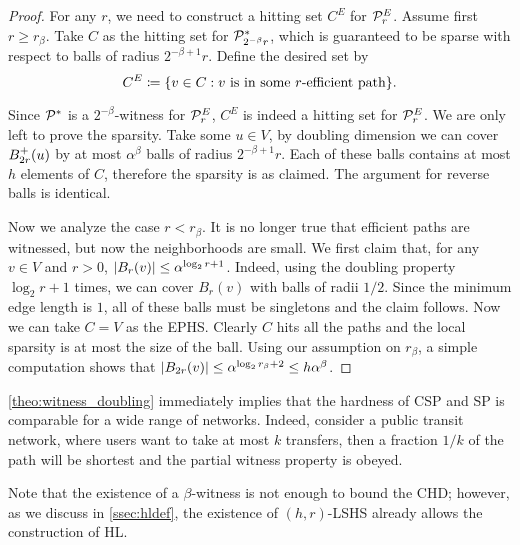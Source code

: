 \begin{proof}
	For any $r$, we need to construct a hitting set $C^E$ for $\mathcal{P}^E_r$.
	Assume first $r\geq r_\beta$.
	Take $C$ as the hitting set for $\mathcal{P}^*_{2^{-\beta}r}$, which is guaranteed to be sparse with respect to balls of radius $2^{-\beta+1}r$.
	Define the desired set by
	\[
	C^E\coloneqq\{v\in C: v \text{ is in some $r$-efficient path} \}.
	\]
	
	Since $\mathcal{P}^*$ is a $2^{-\beta}$-witness for $\mathcal{P}^E_r$, $C^E$ is indeed a hitting set for $\mathcal{P}^E_r$.
	We are only left to prove the sparsity.
	Take some $u\in V$, by doubling dimension we can cover $B^+_{2r}(u)$ by at most $\alpha^\beta$ balls of radius $2^{-\beta+1}r$.
	Each of these balls contains at most $h$ elements of $C$, therefore the sparsity is as claimed.
	The argument for reverse balls is identical.
	
	Now we analyze the case $r< r_\beta$.
	It is no longer true that efficient paths are witnessed, but now the neighborhoods are small.
	We first claim that, for any $v\in V$ and $r>0$, $\lvert B_{r}(v)\rvert\leq \alpha^{\log_2r+1}$.
	Indeed, using the doubling property $\log_2r+1$ times, we can cover $B_r(v)$ with balls of radii $1/2$.
	Since the minimum edge length is $1$, all of these balls must be singletons and the claim follows.
	Now we can take $C=V$ as the EPHS.
	Clearly $C$ hits all the paths and the local sparsity is at most the size of the ball.
	Using our assumption on $r_\beta$, a simple computation shows that $\lvert B_{2r}(v)\rvert\leq \alpha^{\log_2r_\beta+2}\leq h\alpha^\beta$. 
\end{proof}
\begin{remark}
\cref{theo:witness_doubling} immediately implies that the hardness of CSP and SP is comparable for a wide range of networks.
Indeed, consider a public transit network, where users want to take at most $k$ transfers, then a fraction $1/k$ of the path will be shortest and the partial witness property is obeyed.
\end{remark}
Note that the existence of a $\beta$-witness is not enough to bound the CHD; however, as we discuss in \cref{ssec:hldef}, the existence of $(h,r)$-LSHS already allows the construction of HL. 
